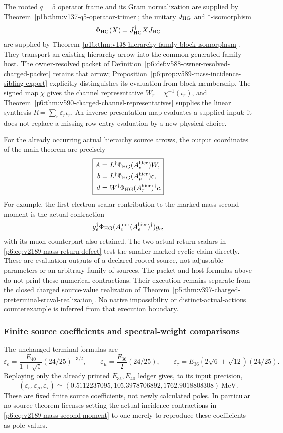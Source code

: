 \documentclass[12pt,a4paper]{article}
\begin{document}
The rooted $q=5$ operator frame and its Gram normalization are supplied by
Theorem~\ref{p1b:thm:v137-q5-operator-trimer}; the unitary $J_{\rm HG}$
and $*$-isomorphism
\[
 \Phi_{\rm HG}(X)=J_{\rm HG}^\dagger XJ_{\rm HG}
\]
are supplied by
Theorem~\ref{p1b:thm:v138-hierarchy-family-block-isomorphism}.
They transport an existing hierarchy arrow into the common generated
family host. The owner-resolved packet of
Definition~\ref{p6:def:v588-owner-resolved-charged-packet} retains that
arrow; Proposition~\ref{p6:prop:v589-mass-incidence-sibling-export}
explicitly distinguishes its evaluation from block membership.
The signed map $\chi$ gives the channel representative
$W_r=\chi^{-1}(\iota_r)$, and
Theorem~\ref{p6:thm:v590-charged-channel-representatives} supplies the
linear synthesis $R=\sum_r\varepsilon_r\iota_r$.
An inverse presentation map evaluates a supplied input; it does not
replace a missing row-entry evaluation by a new physical choice.

For the already occurring actual hierarchy source arrows, the output
coordinates of the main theorem are precisely
\[
 \boxed{\begin{aligned}
 A&=L^\dagger\Phi_{\rm HG}(A_e^{\rm hier})W,\\
 b&=L^\dagger\Phi_{\rm HG}(A_\mu^{\rm hier})c,\\
 d&=W^\dagger\Phi_{\rm HG}(A_\tau^{\rm hier})^\dagger c.
 \end{aligned}}
\]
For example, the first electron scalar contribution to the marked mass
second moment is the actual contraction
\[
 g_e^\dagger\Phi_{\rm HG}
       (A_e^{\rm hier}(A_e^{\rm hier})^\dagger)g_e,
\]
with its muon counterpart also retained. The two actual return scalars
in \eqref{p6:eq:v2189-mass-return-defect} test the smaller marked cyclic
claim directly. These are evaluation outputs of a declared rooted
source, not adjustable parameters or an arbitrary family of sources.
The packet and host formulas above do not print these numerical
contractions. Their execution remains separate from the closed charged
source-value realization of
Theorem~\ref{p5:thm:v397-charged-preterminal-srcval-realization}.
No native impossibility or distinct-actual-actions counterexample is
inferred from that execution boundary.

\subsubsection{Finite source coefficients and spectral-weight comparisons}
\label{p6:app:v2189-electron-source-comparisons}
The unchanged terminal formulas are
\[
 \varepsilon_e=\frac{E_{40}}{1+\sqrt5}(24/25)^{-3/2},\qquad
 \varepsilon_\mu=\frac{E_{36}}2(24/25),\qquad
 \varepsilon_\tau=E_{36}(2\sqrt6+\sqrt{12})(24/25).
\]
Replaying only the already printed $E_{36},E_{40}$ ledger gives,
to its input precision,
\[
 (\varepsilon_e,\varepsilon_\mu,\varepsilon_\tau)
 \simeq(0.5112237095,105.3978706892,1762.9018808308)\ {\mathrm{MeV}}.
\]
These are fixed finite source coefficients, not newly calculated poles.
In particular no source theorem licenses setting the actual incidence
contractions in \eqref{p6:eq:v2189-mass-second-moment} to one merely
to reproduce these coefficients as pole values.
\end{document}
